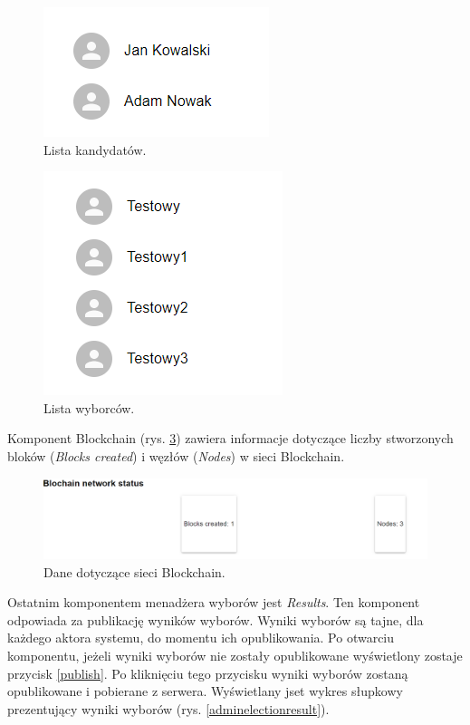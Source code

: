 \documentclass[a4paper,12pt]{book}
\begin{document}
\begin{figure}[H]
	\centering
	\includegraphics{images/infocandidates.png}
	\caption{Lista kandydatów.}\label{infocandidates}
\end {figure}

\begin{figure}[H]
	\centering
	\includegraphics{images/infovoters.png}
	\caption{Lista wyborców.}\label{infovoters}
\end {figure}

Komponent Blockchain (rys. \ref{bcstatus}) zawiera informacje dotyczące liczby stworzonych bloków (\textit{Blocks created}) i węzłów (\textit{Nodes}) w sieci Blockchain. 

\begin{figure}[H]
	\centering
	\includegraphics[width=\textwidth]{images/bcstatus.png}
	\caption{Dane dotyczące sieci Blockchain.}\label{bcstatus}
\end {figure}

Ostatnim komponentem menadżera wyborów jest \textit{Results}. Ten komponent odpowiada za publikację wyników wyborów. Wyniki wyborów są tajne, dla każdego aktora systemu, do momentu ich opublikowania. Po otwarciu komponentu, jeżeli wyniki wyborów nie zostały opublikowane wyświetlony zostaje przycisk \ref{publish}. Po kliknięciu tego przycisku wyniki wyborów zostaną opublikowane i pobierane z serwera. Wyświetlany jset wykres słupkowy prezentujący wyniki wyborów (rys. \ref{adminelectionresult}).
\end{document}

